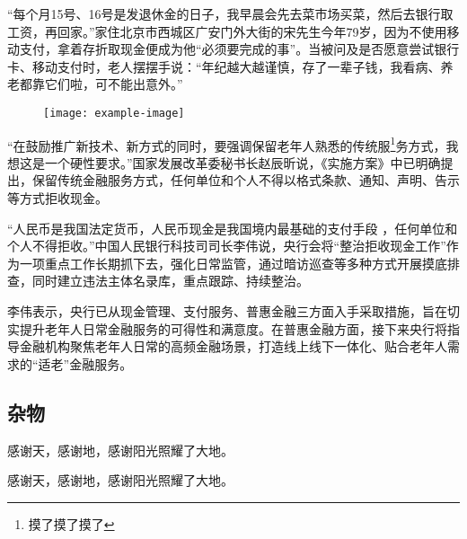 \documentclass{ecnuthesis}
\begin{document}
“每个月15号、16号是发退休金的日子，我早晨会先去菜市场买菜，然后去银行取工资，再回家。”家住北京市西城区广安门外大街的宋先生今年79岁，因为不使用移动支付，拿着存折取现金便成为他“必须要完成的事”。当被问及是否愿意尝试银行卡、移动支付时，老人摆摆手说：“年纪越大越谨慎，存了一辈子钱，我看病、养老都靠它们啦，可不能出意外。”

\begin{figure}
    \centering
    \texttt{[image: example-image]}
  \end{figure}

“在鼓励推广新技术、新方式的同时，要强调保留老年人熟悉的传统服\footnote{摸了摸了摸了}务方式，我想这是一个硬性要求。”国家发展改革委秘书长赵辰昕说，《实施方案》中已明确提出，保留传统金融服务方式，任何单位和个人不得以格式条款、通知、声明、告示等方式拒收现金。

“人民币是我国法定货币，人民币现金是我国境内最基础的支付手段 \cite{Yang_Hy200215} ，任何单位和个人不得拒收。”中国人民银行科技司司长李伟说，央行会将“整治拒收现金工作”作为一项重点工作长期抓下去，强化日常监管，通过暗访巡查等多种方式开展摸底排查，同时建立违法主体名录库，重点跟踪、持续整治。

李伟表示，央行已从现金管理、支付服务、普惠金融三方面入手采取措施，旨在切实提升老年人日常金融服务的可得性和满意度。在普惠金融方面，接下来央行将指导金融机构聚焦老年人日常的高频金融场景，打造线上线下一体化、贴合老年人需求的“适老”金融服务。

\backmatter
\PrintReference

\begin{appendix}
  \chapter{杂物}
  感谢天，感谢地，感谢阳光照耀了大地。
\end{appendix}

\begin{acknowledgement}
  感谢天，感谢地，感谢阳光照耀了大地。
\end{acknowledgement}
\end{document}
